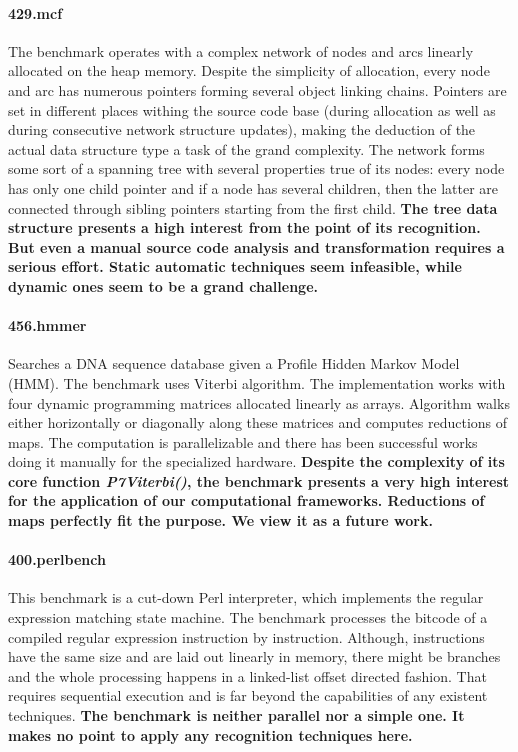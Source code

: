 \paragraph{429.mcf} The benchmark operates with a complex network of nodes and arcs linearly allocated on the heap memory. Despite the simplicity of allocation, every node and arc has numerous pointers forming several object linking chains. Pointers are set in different places withing the source code base (during allocation as well as during consecutive network structure updates), making the deduction of the actual data structure type a task of the grand complexity. The network forms some sort of a spanning tree with several properties true of its nodes: every node has only one child pointer and if a node has several children, then the latter are connected through sibling pointers starting from the first child.\newline\null
\quad\textbf{The tree data structure presents a high interest from the point of its recognition. But even a manual source code analysis and transformation requires a serious effort. Static automatic techniques seem infeasible, while dynamic ones seem to be a grand challenge.}
\paragraph{456.hmmer} Searches a DNA sequence database given a Profile Hidden Markov Model (HMM). The benchmark uses Viterbi algorithm. The implementation works with four dynamic programming matrices allocated linearly as arrays. Algorithm walks either horizontally or diagonally along these matrices and computes reductions of maps. The computation is parallelizable and there has been successful works \cite{Ganesan:2010:AHG:1854776.1854844}\cite{inria} doing it manually for the specialized hardware.\newline\null
\quad\textbf{Despite the complexity of its core function \textit{P7Viterbi()}, the benchmark presents a very high interest for the application of our computational frameworks. Reductions of maps perfectly fit the purpose. We view it as a future work.}
\paragraph{400.perlbench} This benchmark is a cut-down Perl interpreter, which implements the regular expression matching state machine. The benchmark processes the bitcode of a compiled regular expression instruction by instruction. Although, instructions have the same size and are laid out linearly in memory, there might be branches and the whole processing happens in a linked-list offset directed fashion. That requires sequential execution and is far beyond the capabilities of any existent techniques.
\quad\textbf{The benchmark is neither parallel nor a simple one. It makes no point to apply any recognition techniques here.}
